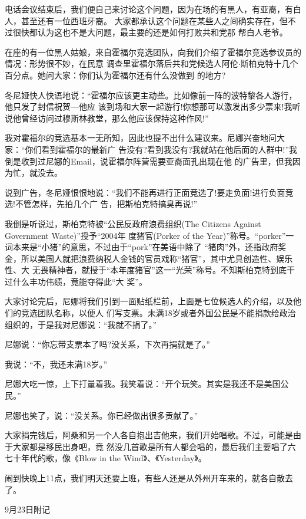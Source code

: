 ﻿\documentclass[11pt]{article}
\begin{document}
电话会议结束后，我们便自己来讨论这个问题，因为在场的有黑人，有亚裔，有白人，甚至还有一位西班牙裔。
大家都承认这个问题在某些人之间确实存在，但不过很快都认为这也不是大问题，最主要的还是如何打败共和党那
帮白人老爷。

在座的有一位黑人姑娘，来自霍福尔竞选团队，向我们介绍了霍福尔竞选参议员的情况：形势很不妙，在民意
调查里霍福尔落后共和党候选人阿伦$\cdot$斯柏克特十几个百分点。她问大家：你们认为霍福尔还有什么没做到
的地方?

冬尼娅快人快语地说：``霍福尔应该更主动些。比如像前一阵的波特黎各人游行，他只发了封信祝贺---他应
该到场和大家一起游行!你想那可以激发出多少票来!我听说他曾经访问过穆斯林教堂，那么他应该保持这种作风!''

我对霍福尔的竞选基本一无所知，因此也提不出什么建议来。尼娜兴奋地问大家：``你们看到霍福尔的最新广
告没有?看到我没有?我就站在他后面的人群中!''我倒是收到过尼娜的Email，说霍福尔阵营需要亚裔面孔出现在他
的广告里，但我因为忙，就没去。

说到广告，冬尼娅恨恨地说：``我们不能再进行正面竞选了!要走负面!进行负面竞选!不管怎样，先拍几个广
告，把斯柏克特搞臭再说!''

我倒是听说过，斯柏克特被``公民反政府浪费组织(The Citizens Against Government Waste)''授予``2004年
度猪官(Porker of the Year)''称号。``porker''一词本来是``小猪''的意思，不过由于``pork''在美语中除了
``猪肉''外，还指政府奖金，所以美国人就把浪费纳税人金钱的官员戏称``猪官''，其中尤具创造性、娱乐性、大
无畏精神者，就授于``本年度猪官''这一``光荣''称号。不知斯柏克特到底干过什么丰功伟绩，竟能夺得此``大
奖''。

大家讨论完后，尼娜将我们引到一面贴纸栏前，上面是七位候选人的介绍，以及他们的竞选团队名称，以便人
们写支票。未满18岁或者外国公民是不能捐款给政治组织的，于是我对尼娜说：``我就不捐了。''

尼娜说：``你忘带支票本了吗?没关系，下次再捐就是了。''

我说：``不，我还未满18岁。''

尼娜大吃一惊，上下打量着我。我笑着说：``开个玩笑。其实是我还不是美国公民。''

尼娜也笑了，说：``没关系。你已经做出很多贡献了。''

大家捐完钱后，阿桑和另一个人各自抱出吉他来，我们开始唱歌。不过，可能是由于大家都是移民出身吧，竟
然没几首歌是所有人都会唱的，最后我们主要唱了六七十年代的歌，像《Blow in the Wind》、《Yesterday》。

闹到快晚上11点，我们明天还要上班，有些人还是从外州开车来的，就各自散去了。

9月23日附记
\end{document}
